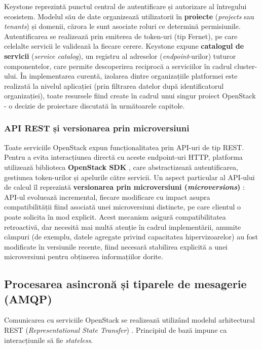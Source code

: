 Keystone reprezintă punctul central de autentificare și autorizare al întregului ecosistem. Modelul său de date organizează utilizatorii în \textbf{proiecte} (\textit{projects} sau \textit{tenants}) și domenii, cărora le sunt asociate roluri ce determină permisiunile. Autentificarea se realizează prin emiterea de token-uri (tip Fernet), pe care celelalte servicii le validează la fiecare cerere. Keystone expune \textbf{catalogul de servicii} (\textit{service catalog}), un registru al adreselor (\textit{endpoint}-urilor) tuturor componentelor, care permite descoperirea reciprocă a serviciilor în cadrul cluster-ului. În implementarea curentă, izolarea dintre organizațiile platformei este realizată la nivelul aplicației (prin filtrarea datelor după identificatorul organizației), toate resursele fiind create în cadrul unui singur proiect OpenStack - o decizie de proiectare discutată în următoarele capitole.

\subsubsection{API REST și versionarea prin microversiuni}

Toate serviciile OpenStack expun funcționalitatea prin API-uri de tip REST. Pentru a evita interacțiunea directă cu aceste endpoint-uri HTTP, platforma utilizează biblioteca \textbf{OpenStack SDK} \cite{openstack_sdk}, care abstractizează autentificarea, gestiunea token-urilor și apelurile către servicii. Un aspect particular al API-ului de calcul îl reprezintă \textbf{versionarea prin microversiuni (\textit{microversions})} \cite{openstack_microversions}: API-ul evoluează incremental, fiecare modificare cu impact asupra compatibilității fiind asociată unei microversiuni distincte, pe care clientul o poate solicita în mod explicit. Acest mecanism asigură compatibilitatea retroactivă, dar necesită mai multă atenție în cadrul implementării, anumite câmpuri (de exemplu, datele agregate privind capacitatea hipervizoarelor) au fost modificate în versiunile recente, fiind necesară stabilirea explicită a unei microversiuni pentru obținerea informațiilor dorite.

\subsection{Procesarea asincronă și tiparele de mesagerie (AMQP)}

Comunicarea cu serviciile OpenStack se realizează utilizând modelul arhitectural REST (\textit{Representational State Transfer}) \cite{fielding2000rest}. Principiul de bază impune ca interacțiunile să fie \textit{stateless}. 

